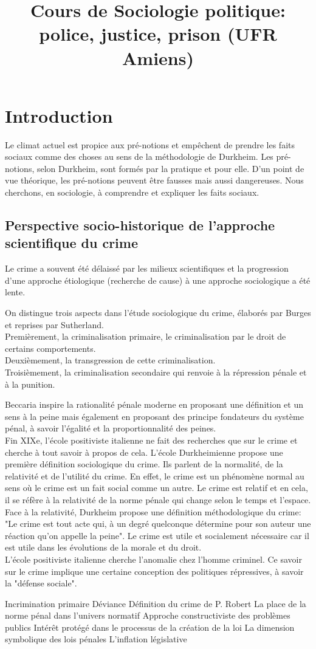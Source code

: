 \documentclass[10pt, a4paper, openany]{book}
\date{}
\title{Cours de Sociologie politique: police, justice, prison (UFR Amiens)}
\begin{document}
\maketitle
\tableofcontents

\chapter{Introduction}

Le climat actuel est propice aux pré-notions et empêchent de prendre les faits sociaux comme des choses au sens de la méthodologie de Durkheim. Les pré-notions, selon Durkheim, sont formés par la pratique et pour elle. D'un point de vue théorique, les pré-notions peuvent être fausses mais aussi dangereuses. Nous cherchons, en sociologie, à comprendre et expliquer les faits sociaux. \\

\section{Perspective socio-historique de l'approche scientifique du crime}

Le crime a souvent été délaissé par les milieux scientifiques et la progression d'une approche étiologique (recherche de cause) à une approche sociologique a été lente.  


On distingue trois aspects dans l'étude sociologique du crime, élaborés par Burges et reprises par Sutherland. \\
Premièrement, la criminalisation primaire, le criminalisation par le droit de certains comportements. \\
Deuxièmement, la transgression de cette criminalisation. \\
Troisièmement, la criminalisation secondaire qui renvoie à la répression pénale et à la punition. 


Beccaria inspire la rationalité pénale moderne en proposant une définition et un sens à la peine mais également en proposant des principe fondateurs du système pénal, à savoir l'égalité et la proportionnalité des peines. \\
Fin XIXe, l'école positiviste italienne ne fait des recherches que sur le crime et cherche à tout savoir à propos de cela. L'école Durkheimienne propose une première définition sociologique du crime. Ils parlent de la normalité, de la relativité et de l'utilité du crime. En effet, le crime est un phénomène normal au sens où le crime est un fait social comme un autre. Le crime est relatif et en cela, il se réfère à la relativité de la norme pénale qui change selon le temps et l'espace. Face à la relativité, Durkheim propose une définition méthodologique du crime: "Le crime est tout acte qui, à un degré quelconque détermine pour son auteur une réaction qu'on appelle la peine". Le crime est utile et socialement nécessaire car il est utile dans les évolutions de la morale et du droit. \\
L'école positiviste italienne cherche l'anomalie chez l'homme criminel. Ce savoir sur le crime implique une certaine conception des politiques répressives, à savoir la "défense sociale". 





Incrimination primaire
Déviance
Définition du crime de P. Robert
La place de la norme pénal dans l'univers normatif
Approche constructiviste des problèmes publics
Intérêt protégé dans le processus de la création de la loi
La dimension symbolique des lois pénales
L'inflation législative
\end{document}
